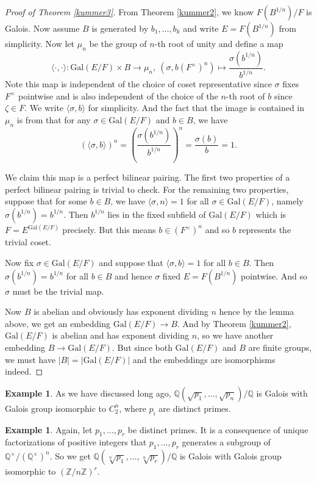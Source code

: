 \documentclass[12pt]{report}
\theoremstyle{definition}
\newtheorem{example}[theorem]{Example}
\newcommand{\gal}{\text{Gal}}
\newcommand{\zz}{\mathbb{Z}}
\newcommand{\ta}[1]{\langle #1 \rangle}
\newcommand{\qq}{\mathbb{Q}}
\begin{document}
\begin{proof}[Proof of Theorem \ref{kummer3}]
	From Theorem \ref{kummer2}, we know $F(B^{1/n})/F$ is Galois. Now assume $B$ is generated by $b_1,\dots,b_k$ and write $E=F(B^{1/n})$ from simplicity. Now let $\mu_n$ be the group of $n$-th root of unity and define a map
	$$\ta{\cdot,\cdot}: \gal(E/F)\times B\to\mu_n,~ (\sigma, b(F^\times)^n) \mapsto \frac{\sigma(b^{1/n})}{b^{1/n}}.$$
	Note this map is independent of the choice of coset representative since $\sigma$ fixes $F^\times$ pointwise and is also independent of the choice of the $n$-th root of $b$ since $\zeta\in F$. We write $\ta{\sigma,b}$ for simplicity. And the fact that the image is contained in $\mu_n$ is from that for any $\sigma\in \gal(E/F)$ and $b\in B$, we have
	$$(\ta{\sigma,b})^n =(\frac{\sigma(b^{1/n})}{b^{1/n}})^n=\frac{\sigma(b)}{b}=1.$$


	We claim this map is a perfect bilinear pairing. The first two properties of a perfect bilinear pairing is trivial to check. For the remaining two properties, suppose that for some $b\in B$, we have $\ta{\sigma,n}=1$ for all $\sigma\in \gal(E/F)$, namely $\sigma(b^{1/n})=b^{1/n}$. Then $b^{1/n}$ lies in the fixed subfield of $\gal(E/F)$ which is $F=E^{\gal(E/F)}$ precisely. But this means $b\in (F^\times)^n$ and so $b$ represents the trivial coset.


	Now fix $\sigma\in\gal(E/F)$ and suppose that $\ta{\sigma,b}=1$ for all $b\in B$. Then $\sigma(b^{1/n})=b^{1/n}$ for all $b\in B$ and hence $\sigma$ fixed $E=F(B^{1/n})$ pointwise. And so $\sigma$ must be the trivial map.

	Now $B$ is abelian and obviously has exponent dividing $n$ hence by the lemma above, we get an embedding $\gal(E/F)\to B$. And by Theorem \ref{kummer2}, $\gal(E/F)$ is abelian and has exponent dividing $n$, so we have another embedding $B\to \gal(E/F)$. But since both $\gal(E/F)$ and $B$ are finite groups, we must have $|B|=|\gal(E/F)|$ and the embeddings are isomorphisms indeed.

\end{proof}

\begin{example}
	As we have discussed long ago, $\qq(\sqrt{p_1},\dots,\sqrt{p_n})/\qq$ is Galois with Galois group isomorphic to $C_2^n$, where $p_i$ are distinct primes.
\end{example}

\begin{example}
	Again, let $p_1,\dots,p_r$ be distinct primes. It is a consequence of unique factorizations of positive integers that $p_1,\dots,p_r$ generates a subgroup of $\qq^\times/(\qq^\times)^n$. So we get $\qq(\sqrt[n]{p_1},\dots,\sqrt[n]{p_r})/\qq$ is Galois with Galois group isomorphic to $(\zz/n\zz)^r$.
\end{example}
\end{document}
